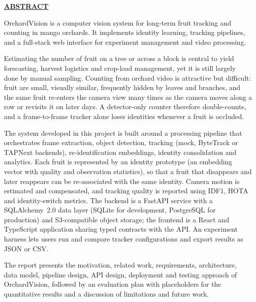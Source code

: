 \documentclass[12pt,a4paper]{report}
\newcommand{\fronthead}[1]{%
  \begin{center}\underline{\textbf{\fontsize{14}{17}\selectfont #1}}\end{center}\vspace{6pt}}
\begin{document}

\clearpage
\pagestyle{fancy}
\setcounter{page}{1}

\fronthead{ABSTRACT}
OrchardVision is a computer vision system for long-term fruit tracking and counting in mango orchards. It implements identity learning, tracking pipelines, and a full-stack web interface for experiment management and video processing.

Estimating the number of fruit on a tree or across a block is central to yield forecasting, harvest logistics and crop-load management, yet it is still largely done by manual sampling. Counting from orchard video is attractive but difficult: fruit are small, visually similar, frequently hidden by leaves and branches, and the same fruit re-enters the camera view many times as the camera moves along a row or revisits it on later days. A detector-only counter therefore double-counts, and a frame-to-frame tracker alone loses identities whenever a fruit is occluded.

The system developed in this project is built around a processing pipeline that orchestrates frame extraction, object detection, tracking (mock, ByteTrack or TAPNext backends), re-identification embeddings, identity consolidation and analytics. Each fruit is represented by an identity prototype (an embedding vector with quality and observation statistics), so that a fruit that disappears and later reappears can be re-associated with the same identity. Camera motion is estimated and compensated, and tracking quality is reported using IDF1, HOTA and identity-switch metrics. The backend is a FastAPI service with a SQLAlchemy~2.0 data layer (SQLite for development, PostgreSQL for production) and S3-compatible object storage; the frontend is a React and TypeScript application sharing typed contracts with the API. An experiment harness lets users run and compare tracker configurations and export results as JSON or CSV.

The report presents the motivation, related work, requirements, architecture, data model, pipeline design, API design, deployment and testing approach of OrchardVision, followed by an evaluation plan with placeholders for the quantitative results and a discussion of limitations and future work.
\end{document}
